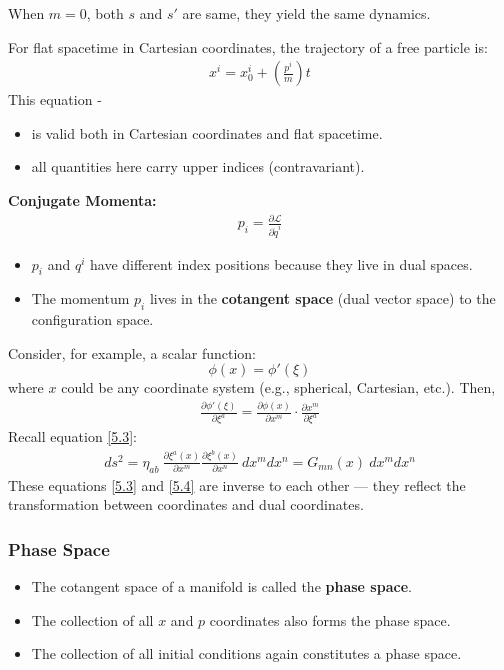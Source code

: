 \documentclass[14pt]{article} %
\begin{document}
When $m = 0$, both $s$ and $s'$ are same, they yield the same dynamics.
\begin{tcolorbox}[ title=\textbf{Note:}]
For flat spacetime in Cartesian coordinates, the trajectory of a free particle is:
\begin{align*}
x^i = x^i_0 + \left( \frac{p^i}{m} \right)t
\end{align*}
This equation -
\begin{itemize}
    \item is valid both in Cartesian coordinates and flat spacetime.
    \item all quantities here carry upper indices (contravariant).
\end{itemize}

\vspace{1em}
\noindent
\textbf{Conjugate Momenta:}
\begin{align*}
p_i = \frac{\partial \mathcal{L}}{\partial \dot{q}^i}
\end{align*}

\begin{itemize}
    \item $p_i$ and $q^i$ have different index positions because they live in dual spaces.
    \item The momentum $p_i$ lives in the \textbf{cotangent space} (dual vector space) to the configuration space.
\end{itemize}
\end{tcolorbox}
Consider, for example, a scalar function: 
$$\phi(x) = \phi'(\xi)$$
where $x$ could be any coordinate system (e.g., spherical, Cartesian, etc.). Then,
\begin{align*}
    \frac{\partial \phi'(\xi)}{\partial \xi^a} 
    = \frac{\partial \phi(x)}{\partial x^m} \cdot \frac{\partial x^m}{\partial \xi^a} \tag{5.4} \label{5.4}
\end{align*}
Recall equation \eqref{5.3}:
\begin{align*}
    ds^2 = \eta_{ab}~ \frac{\partial \xi^a(x)}{\partial x^m} \frac{\partial \xi^b(x)}{\partial x^n}~ dx^m dx^n = G_{mn}(x)~ dx^m dx^n
\end{align*}
These equations \eqref{5.3} and \eqref{5.4} are inverse to each other — they reflect the transformation between coordinates and dual coordinates.
\begin{tcolorbox}[ title=\textbf{Note:}]
\subsubsection*{Phase Space}
\begin{itemize}
    \item The cotangent space of a manifold is called the \textbf{phase space}.
    \item The collection of all $x$ and $p$ coordinates also forms the phase space.
    \item The collection of all initial conditions again constitutes a phase space.
\end{itemize}
\end{tcolorbox}
\end{document}

